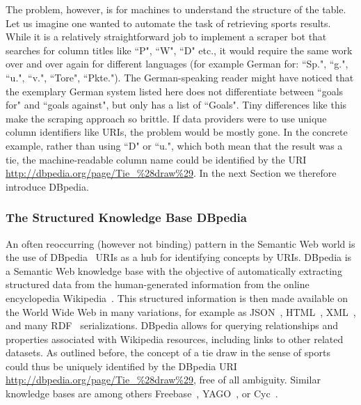 \documentclass[12pt]{article}
\begin{document}
The problem, however, is for machines to understand the structure of the table. Let us imagine one wanted to automate the task of retrieving sports results. While it is a relatively straightforward job to implement a scraper bot that searches for column titles like ``P", ``W", ``D" etc., it would require the same work over and over again for different languages (for example German for: ``Sp.", ``g.", ``u.", ``v.", ``Tore", ``Pkte."). The German-speaking reader might have noticed that the exemplary German system listed here does not differentiate between ``goals for" and ``goals against", but only has a list of ``Goals". Tiny differences like this make the scraping approach so brittle. If data providers were to use unique column identifiers like URIs, the problem would be mostly gone. In the concrete example, rather than using ``D" or ``u.", which both mean that the result was a tie, the machine-readable column name could be identified by the URI \url{http://dbpedia.org/page/Tie_%28draw%29}. In the next Section we therefore introduce DBpedia.

\subsubsection{The Structured Knowledge Base DBpedia}
An often reoccurring (however not binding) pattern in the Semantic Web world is the use of DBpedia~\cite{Bizer:DBpedia} URIs as a hub for identifying concepts by URIs. DBpedia is a Semantic Web knowledge base with the objective of automatically extracting structured data from the human-generated information from the online encyclopedia Wikipedia~\cite{wikipedia}. This structured information is then made available on the World Wide Web in many variations, for example as JSON~\cite{json}, HTML~\cite{w3c_html4}, XML~\cite{Bray1998}, and many RDF~\cite{RDF} serializations. DBpedia allows for querying relationships and properties associated with Wikipedia resources, including links to other related datasets. As outlined before, the concept of a tie draw in the sense of sports could thus be uniquely identified by the DBpedia URI \url{http://dbpedia.org/page/Tie_%28draw%29}, free of all ambiguity. Similar knowledge bases are among others Freebase~\cite{NYTimes:Freebase}, YAGO~\cite{yago}, or Cyc~\cite{Cyc}.
\end{document}
